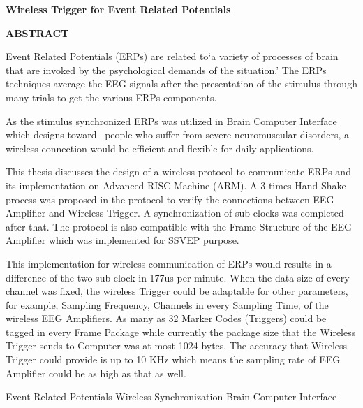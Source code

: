 \begin{center}  
\textbf{Wireless Trigger for Event Related Potentials}
\end{center}
\begin{center}  
\textbf{ABSTRACT}
\end{center}
\vspace{2mm}

Event Related Potentials (ERPs) are related to‘a variety of processes of brain that are invoked by the psychological demands of the situation.’ The ERPs techniques average the EEG signals after the presentation of the stimulus through many trials to get the various ERPs components. 

As the stimulus synchronized ERPs was utilized in Brain Computer Interface which designs toward~\cite{Allison2007} people who suffer from severe neuromuscular disorders, a wireless connection would be efficient and flexible for daily applications.

This thesis discusses the design of a wireless protocol to communicate ERPs and its implementation on Advanced RISC Machine (ARM). A 3-times Hand Shake process was proposed in the protocol to verify the connections between EEG Amplifier and Wireless Trigger. A synchronization of sub-clocks was completed after that. The protocol is also compatible with the Frame Structure of the EEG Amplifier which was implemented for SSVEP purpose.

	This implementation for wireless communication of ERPs would results in a difference of the two sub-clock in 177us per minute. When the data size of every channel was fixed, the wireless Trigger could be adaptable for other parameters, for example, Sampling Frequency, Channels in every Sampling Time, of the wireless EEG Amplifiers. As many as 32 Marker Codes (Triggers) could be tagged in every Frame Package while currently the package size that the Wireless Trigger sends to Computer was at most 1024 bytes. The accuracy that Wireless Trigger could provide is up to 10 KHz which means the sampling rate of EEG Amplifier could be as high as that as well. 

\vspace{3mm}
\quad Event Related Potentials \quad Wireless Synchronization \quad Brain Computer Interface
